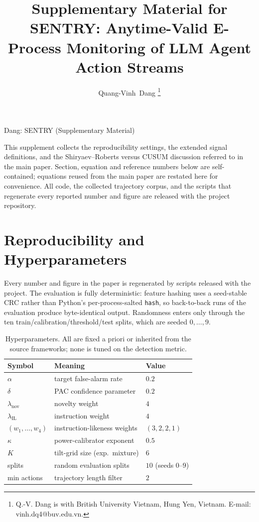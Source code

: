 \documentclass[10pt,journal,compsoc]{IEEEtran}
\newcommand{\botrule}{\bottomrule}
\begin{document}
\title{Supplementary Material for\\ SENTRY: Anytime-Valid E-Process Monitoring
of LLM Agent Action Streams}

\author{Quang-Vinh~Dang%
\thanks{Q.-V. Dang is with British University Vietnam, Hung Yen, Vietnam.
E-mail: vinh.dq4@buv.edu.vn.}}

%
{Dang: SENTRY (Supplementary Material)}

\maketitle

\noindent This supplement collects the reproducibility settings, the extended
signal definitions, and the Shiryaev--Roberts versus CUSUM discussion referred
to in the main paper. Section, equation and reference numbers below are
self-contained; equations reused from the main paper are restated here for
convenience. All code, the collected trajectory corpus, and the scripts that
regenerate every reported number and figure are released with the project
repository.

\section{Reproducibility and Hyperparameters}\label{app:repro}

Every number and figure in the paper is regenerated by scripts released with
the project. The evaluation is fully deterministic: feature hashing uses a
seed-stable CRC rather than Python's per-process-salted \texttt{hash}, so
back-to-back runs of the evaluation produce byte-identical output. Randomness
enters only through the ten train/calibration/threshold/test splits, which are
seeded \(0,\dots,9\).

\begin{table}[h]
\centering
\caption{Hyperparameters. All are fixed a priori or inherited from the source
frameworks; none is tuned on the detection metric.}\label{tab:hyper}
\begin{tabular}{@{}lll@{}}
\toprule
Symbol & Meaning & Value \\
\midrule
\(\alpha\) & target false-alarm rate & \(0.2\) \\
\(\delta\) & PAC confidence parameter & \(0.2\) \\
\(\lambda_{\mathrm{nov}}\) & novelty weight & \(4\) \\
\(\lambda_{\mathrm{IL}}\) & instruction weight & \(4\) \\
\((w_1,\dots,w_4)\) & instruction-likeness weights & \((3,2,2,1)\) \\
\(\kappa\) & power-calibrator exponent & \(0.5\) \\
\(K\) & tilt-grid size (exp.\ mixture) & \(6\) \\
splits & random evaluation splits & \(10\) (seeds \(0\)--\(9\)) \\
min actions & trajectory length filter & \(2\) \\
\botrule
\end{tabular}
\end{table}
\end{document}
